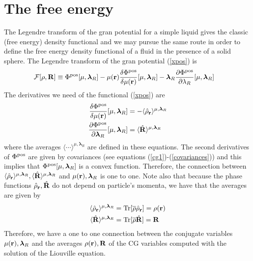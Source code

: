 \documentclass[b5paper,openright,10pt]{book}
\begin{document}
\section{The free energy}
The Legendre transform of the gran potential for a simple liquid gives the classic (free energy) density functional and we may pursue the same route in order to define the free energy density functional of a fluid in the presence of a solid sphere. The Legendre transform of the gran potential (\ref{xpos}) is
\begin{align}
  {\cal F}[\rho,{\bf R}]&\equiv  \Phi^{\rm pos}[\mu,\boldsymbol{\lambda}_R]
-\mu({\bf r})\frac{\delta\Phi^{\rm pos}}{\delta\mu({\bf r})}[\mu,\boldsymbol{\lambda}_R] 
-\boldsymbol{\lambda}_R\frac{\partial \Phi^{\rm pos}}{\partial \lambda_R}[\mu,\boldsymbol{\lambda}_R] 
\label{legPrev}
\end{align}
The derivatives we need of the functional (\ref{xpos}) are
\begin{align}
 \frac{\delta \Phi^{\rm pos}}{\delta \mu({\bf r})}[\mu,\boldsymbol{\lambda}_R]&=-
\langle \hat{\rho}_{\bf r}\rangle^{\mu,\boldsymbol{\lambda}_R}
\nonumber\\
  \frac{\partial \Phi^{\rm pos}}{\partial \boldsymbol{\lambda}_R}[\mu,\boldsymbol{\lambda}_R]&=
\langle \hat{\bf R}\rangle^{\mu,\boldsymbol{\lambda}_R}
\end{align}
where               the                averages               $\langle
\cdots\rangle^{\mu,\boldsymbol{\lambda}_R}$   are  defined   in  these
equations.  The second  derivatives of $ \Phi^{\rm pos}$  are given by
covariances  (see   equations  (\ref{cg1})-(\ref{covariances}))   and  this
implies that $\Phi^{\rm  pos}[\mu,\boldsymbol{\lambda}_R]$ is a convex
function.  Therefore, the  connection between $\langle \hat{\rho}_{\bf
  r}\rangle^{\mu,\boldsymbol{\lambda}_R},       \langle       \hat{\bf
  R}\rangle^{\mu,\boldsymbol{\lambda}_R}$         and        $\mu({\bf
  r}),\boldsymbol{\lambda}_R$ is  one to  one. Note also  that because
the phase functions  $ \hat{\rho}_{\bf r}, \hat{\bf R}$  do not depend
on particle's momenta, we have that the averages are given by
\begin{align}
  \langle \hat{\rho}_{\bf r}\rangle^{\mu,\boldsymbol{\lambda}_R} &={\rm Tr}[\overline{\rho}\hat{\rho}_{\bf r}]=\rho({\bf r})
\nonumber\\
  \langle \hat{\bf R}\rangle^{\mu,\boldsymbol{\lambda}_R} &={\rm Tr}[\overline{\rho}\hat{\bf R}]={\bf R}
\end{align}
Therefore,  we have  a one  to  one connection  between the  conjugate
variables  $\mu({\bf  r}),\boldsymbol{\lambda}_R$   and  the  averages
$\rho({\bf  r}),{\bf  R}$  of  the  CG  variables computed with the solution of the Liouville equation. 
\end{document}
